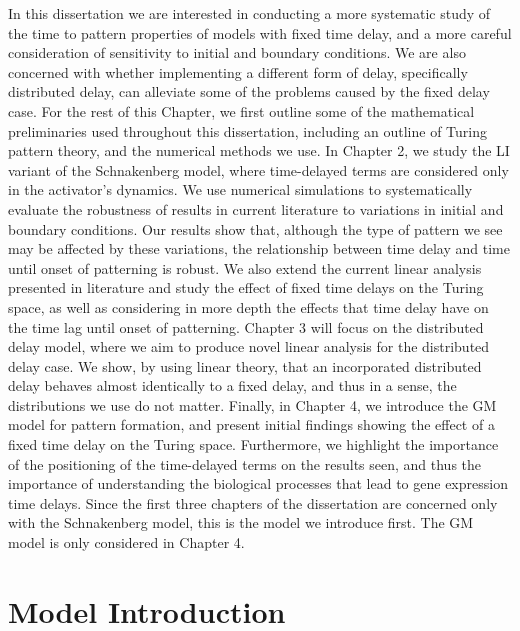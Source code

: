 In this dissertation we are interested in conducting a more systematic study of the time to pattern properties of models with fixed time delay, and a more careful consideration of sensitivity to initial and boundary conditions. We are also concerned with whether implementing a different form of delay, specifically distributed delay, can alleviate some of the problems caused by the fixed delay case. For the rest of this Chapter, we first outline some of the mathematical preliminaries used throughout this dissertation, including an outline of Turing pattern theory, and the numerical methods we use. In Chapter 2, we study the LI variant of the Schnakenberg model, where time-delayed terms are considered only in the activator's dynamics. We use numerical simulations to systematically evaluate the robustness of results in current literature to variations in initial and boundary conditions. Our results show that, although the type of pattern we see may be affected by these variations, the relationship between time delay and time until onset of patterning is robust. We also extend the current linear analysis presented in literature and study the effect of fixed time delays on the Turing space, as well as considering in more depth the effects that time delay have on the time lag until onset of patterning. Chapter 3 will focus on the distributed delay model, where we aim to produce novel linear analysis for the distributed delay case. We show, by using linear theory, that an incorporated distributed delay behaves almost identically to a fixed delay, and thus in a sense, the distributions we use do not matter. Finally, in Chapter 4, we introduce the GM model for pattern formation, and present initial findings showing the effect of a fixed time delay on the Turing space. Furthermore, we highlight the importance of the positioning of the time-delayed terms on the results seen, and thus the importance of understanding the biological processes that lead to gene expression time delays. Since the first three chapters of the dissertation are concerned only with the Schnakenberg model, this is the model we introduce first. The GM model is only considered in Chapter 4.

\section{Model Introduction}

